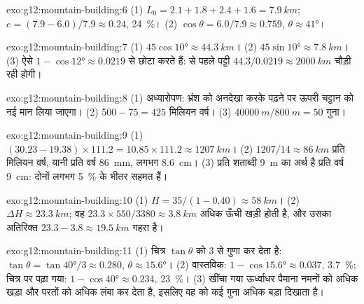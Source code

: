 \begin{solution}{exo:g12:mountain-building:6}
(1) $L_0 = 2.1 + 1.8 + 2.4 + 1.6 = \qty{7.9}{km}$;
$e = (7.9 - 6.0)/7.9 \approx 0.24$, \qty{24}{\percent}। (2) $\cos\theta =
6.0/7.9 \approx 0.759$, $\theta \approx \ang{41}$।
\end{solution}

\begin{solution}{exo:g12:mountain-building:7}
(1) $45\cos\ang{10} \approx \qty{44.3}{km}$। (2) $45\sin\ang{10} \approx
\qty{7.8}{km}$। (3) ऐसे  $1 - \cos\ang{12} \approx 0.0219$ से छोटा करते हैं:
 से पहले पट्टी $44.3/0.0219 \approx \qty{2000}{km}$ चौड़ी रही
होगी।
\end{solution}

\begin{solution}{exo:g12:mountain-building:8}
(1) अध्यारोपण: भ्रंश को अनदेखा करके पढ़ने पर ऊपरी चट्टान को
नई मान लिया जाएगा। (2) $500 - 75 = 425$ मिलियन वर्ष। (3) $\qty{40000}{m} /
\qty{800}{m} = 50$ गुना।
\end{solution}

\begin{solution}{exo:g12:mountain-building:9}
(1) $(30.23 - 19.38) \times 111.2 = 10.85 \times 111.2 \approx
\qty{1207}{km}$। (2) $1207/14 \approx \qty{86}{km}$ प्रति मिलियन वर्ष,
यानी प्रति वर्ष \qty{86}{mm}, लगभग \qty{8.6}{cm}। (3) प्रति शताब्दी \qty{9}{m}
का अर्थ है प्रति वर्ष \qty{9}{cm}: दोनों लगभग \qty{5}{\percent} के भीतर सहमत हैं।
\end{solution}

\begin{solution}{exo:g12:mountain-building:10}
(1) $H = 35/(1 - 0.40) \approx \qty{58}{km}$। (2) $\Delta H \approx
\qty{23.3}{km}$; वह $23.3 \times 550/3380 \approx
\qty{3.8}{km}$ अधिक ऊँची खड़ी होती है, और उसका अतिरिक्त  $23.3 - 3.8 \approx \qty{19.5}{km}$ गहरा है।
\end{solution}

\begin{solution}{exo:g12:mountain-building:11}
(1) चित्र $\tan\theta$ को 3 से गुणा कर देता है: $\tan\theta = \tan\ang{40}/3
\approx 0.280$, $\theta \approx \ang{15.6}$। (2) वास्तविक: $1 - \cos\ang{15.6}
\approx 0.037$, \qty{3.7}{\percent}; चित्र पर पढ़ा गया: $1 - \cos\ang{40}
\approx 0.234$, \qty{23}{\percent}। (3) खींचा गया ऊर्ध्वाधर पैमाना
नमनों को अधिक खड़ा और परतों को अधिक लंबा कर देता है, इसलिए वह  को कई
गुना अधिक बड़ा दिखाता है।
\end{solution}

